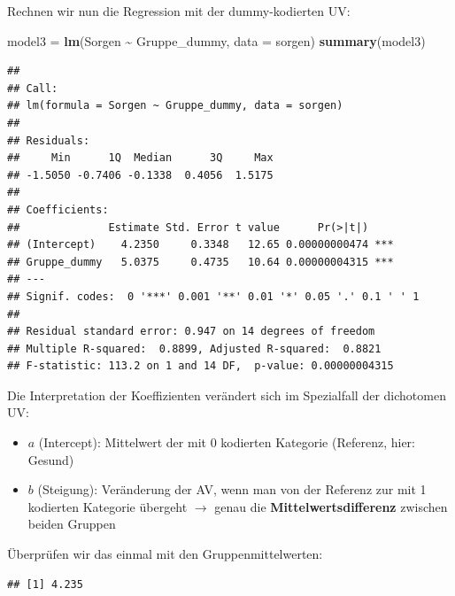 \documentclass[
]{book}
\newenvironment{Shaded}{\begin{snugshade}}{\end{snugshade}}
\newcommand{\AttributeTok}[1]{\textcolor[rgb]{0.13,0.29,0.53}{#1}}
\newcommand{\FunctionTok}[1]{\textcolor[rgb]{0.13,0.29,0.53}{\textbf{#1}}}
\newcommand{\NormalTok}[1]{#1}
\newcommand{\OtherTok}[1]{\textcolor[rgb]{0.56,0.35,0.01}{#1}}
\newcommand{\SpecialCharTok}[1]{\textcolor[rgb]{0.81,0.36,0.00}{\textbf{#1}}}
\newcommand{\StringTok}[1]{\textcolor[rgb]{0.31,0.60,0.02}{#1}}
\providecommand{\tightlist}{%
  \setlength{\itemsep}{0pt}\setlength{\parskip}{0pt}}
\begin{document}
Rechnen wir nun die Regression mit der dummy-kodierten UV:

\begin{Shaded}
\begin{Highlighting}[]
\NormalTok{model3 }\OtherTok{=} \FunctionTok{lm}\NormalTok{(Sorgen }\SpecialCharTok{\textasciitilde{}}\NormalTok{ Gruppe\_dummy, }\AttributeTok{data =}\NormalTok{ sorgen)}
\FunctionTok{summary}\NormalTok{(model3)}
\end{Highlighting}
\end{Shaded}

\begin{verbatim}
## 
## Call:
## lm(formula = Sorgen ~ Gruppe_dummy, data = sorgen)
## 
## Residuals:
##     Min      1Q  Median      3Q     Max 
## -1.5050 -0.7406 -0.1338  0.4056  1.5175 
## 
## Coefficients:
##              Estimate Std. Error t value      Pr(>|t|)    
## (Intercept)    4.2350     0.3348   12.65 0.00000000474 ***
## Gruppe_dummy   5.0375     0.4735   10.64 0.00000004315 ***
## ---
## Signif. codes:  0 '***' 0.001 '**' 0.01 '*' 0.05 '.' 0.1 ' ' 1
## 
## Residual standard error: 0.947 on 14 degrees of freedom
## Multiple R-squared:  0.8899, Adjusted R-squared:  0.8821 
## F-statistic: 113.2 on 1 and 14 DF,  p-value: 0.00000004315
\end{verbatim}

Die Interpretation der Koeffizienten verändert sich im Spezialfall der dichotomen UV:

\begin{itemize}
\tightlist
\item
  \(a\) (Intercept): Mittelwert der mit 0 kodierten Kategorie (Referenz, hier: Gesund)
\item
  \(b\) (Steigung): Veränderung der AV, wenn man von der Referenz zur mit 1 kodierten Kategorie übergeht \(\rightarrow\) genau die \textbf{Mittelwertsdifferenz} zwischen beiden Gruppen
\end{itemize}

Überprüfen wir das einmal mit den Gruppenmittelwerten:

\begin{Shaded}
\end{Shaded}

\begin{verbatim}
## [1] 4.235
\end{verbatim}
\end{document}
